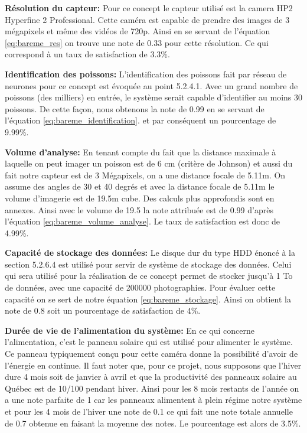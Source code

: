 \textbf{Résolution du capteur:} Pour ce concept le capteur utilisé est la camera HP2 Hyperfine 2 Professional. Cette caméra est capable de prendre des images de 3 mégapixels et même des vidéos de 720p. Ainsi en se servant de l’équation \ref{eq:bareme_res} on trouve une note de 0.33 pour cette résolution. Ce qui correspond à un taux de satisfaction de 3.3\%.
\vspace{5mm}


\textbf{Identification des poissons:} L’identification des poissons fait par réseau de neurones pour ce concept est évoquée au point 5.2.4.1. Avec un grand nombre de poissons (des milliers) en entrée, le système serait capable d’identifier au moins 30 poissons. De cette façon, nous obtenons la note de 0.99 en se servant de l’équation \ref{eq:bareme_identification}. et par conséquent un pourcentage de 9.99\%.
\vspace{5mm}


\textbf{Volume d’analyse:} En tenant compte du fait que la distance maximale à laquelle on peut imager un poisson est de 6 cm (critère de Johnson) et aussi du fait notre capteur est de 3 Mégapixels, on a une distance focale de 5.11m. On assume des angles de 30 et 40 degrés et avec la distance focale de 5.11m le volume d’imagerie est de 19.5m cube. Des calculs plus approfondis sont en annexes. Ainsi avec le volume de 19.5 la note attribuée est de 0.99 d’après l’équation \ref{eq:bareme_volume_analyse}. Le taux de satisfaction est donc de 4.99\%.
\vspace{5mm}


\textbf{Capacité de stockage des données:} Le disque dur du type HDD énoncé à la section 5.2.6.4 est utilisé pour servir de système de stockage des données. Celui qui sera utilisé pour la réalisation de ce concept permet de stocker jusqu’à 1 To de données, avec une capacité de 200000 photographies. Pour évaluer cette capacité on se sert de notre équation \ref{eq:bareme_stockage}. Ainsi on obtient la note de 0.8 soit un pourcentage de satisfaction de 4\%.
\vspace{5mm}

  
\textbf{Durée de vie de l’alimentation du système:} En ce qui concerne l’alimentation, c’est le panneau solaire qui est utilisé pour alimenter le système. Ce panneau typiquement conçu pour cette caméra donne la possibilité d’avoir de l’énergie en continue. Il faut noter que, pour ce projet, nous supposons que l’hiver dure 4 mois soit de janvier à avril et que la productivité des panneaux solaire au Québec est de 10/100 pendant hiver. Ainsi pour les 8 mois restants de l’année on a une note parfaite de 1 car les panneaux alimentent à plein régime notre système et pour les 4 mois de l’hiver une note de 0.1  ce qui fait une note totale annuelle de 0.7 obtenue en faisant la moyenne des notes. Le pourcentage est alors de 3.5\%.
\vspace{5mm}
 
